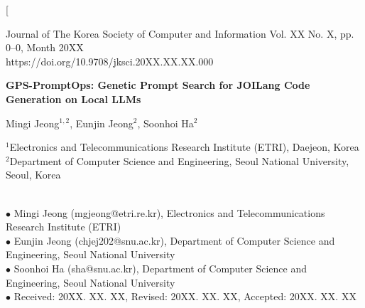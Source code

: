 \documentclass[10pt,twocolumn]{article}
\newcommand{\rev}[1]{{\color{revisionblue}#1}}
\begin{document}
\twocolumn[
\begin{@twocolumnfalse}

\begin{center}
{\small Journal of The Korea Society of Computer and Information \hfill Vol. XX No. X, pp. 0--0, Month 20XX}\\
{\small https://doi.org/10.9708/jksci.20XX.XX.XX.000}
\end{center}

\vspace{0.6em}

\begin{center}
{\LARGE \bf \rev{GPS-PromptOps: Genetic Prompt Search for JOILang Code Generation on Local LLMs}}
\end{center}

\vspace{0.4em}

\begin{center}
{\large Mingi Jeong$^{1,2}$, Eunjin Jeong$^{2}$, Soonhoi Ha$^{2}$}
\end{center}

\vspace{0.2em}

\begin{center}
{\small $^{1}$Electronics and Telecommunications Research Institute (ETRI), Daejeon, Korea}\\
{\small $^{2}$Department of Computer Science and Engineering, Seoul National University, Seoul, Korea}
\end{center}

\vspace{0.4em}

\\
{\small $\bullet$ Mingi Jeong (mgjeong@etri.re.kr), Electronics and Telecommunications Research Institute (ETRI)}\\
{\small $\bullet$ Eunjin Jeong (chjej202@snu.ac.kr), Department of Computer Science and Engineering, Seoul National University}\\
{\small $\bullet$ Soonhoi Ha (sha@snu.ac.kr), Department of Computer Science and Engineering, Seoul National University}\\
{\small $\bullet$ Received: 20XX. XX. XX, Revised: 20XX. XX. XX, Accepted: 20XX. XX. XX}

\vspace{0.5em}



\end{@twocolumnfalse}
\end{document}
